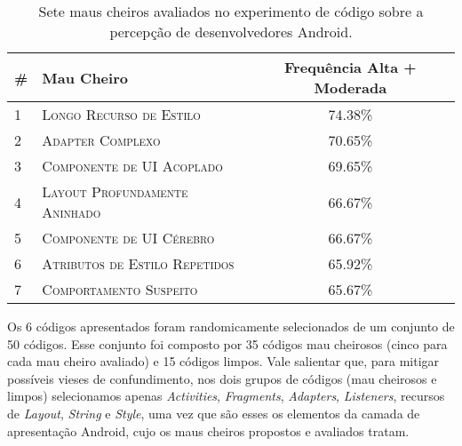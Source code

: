 \begin{table}
\centering
\renewcommand*{\arraystretch}{1}
\footnotesize 
\caption{Sete maus cheiros avaliados no experimento de código sobre a percepção de desenvolvedores Android.}
\begin{tabular}{@{}lp{7cm}c@{}}
\toprule
\# & \multirow{1}{*}{\textbf{Mau Cheiro}} & \multirow{1}{*}{\textbf{Frequência Alta + Moderada}}  \\
\toprule
1 & \textsc{\small Longo Recurso de Estilo}          & 74.38\% \\
2 & \textsc{\small Adapter Complexo}                 & 70.65\% \\
3 & \textsc{\small Componente de UI Acoplado}        & 69.65\% \\
4 & \textsc{\small Layout Profundamente Aninhado}    & 66.67\% \\
5 & \textsc{\small Componente de UI Cérebro}         & 66.67\% \\
6 & \textsc{\small Atributos de Estilo Repetidos}    & 65.92\% \\
7 & \textsc{\small Comportamento Suspeito}           & 65.67\% \\
\bottomrule
\end{tabular}
\label{tab:selected-smells}
\end{table}


Os 6 códigos apresentados foram randomicamente selecionados de um conjunto de 50 códigos. Esse conjunto foi composto por 35 códigos mau cheirosos (cinco para cada mau cheiro avaliado) e 15 códigos limpos. Vale salientar que, para mitigar possíveis vieses de confundimento, nos dois grupos de códigos (mau cheirosos e limpos) selecionamos apenas \textit{Activities}, \textit{Fragments}, \textit{Adapters}, \textit{Listeners}, recursos de \textit{Layout}, \textit{String} e \textit{Style}, uma vez que são esses os elementos da camada de apresentação Android, cujo os maus cheiros propostos e avaliados tratam.

